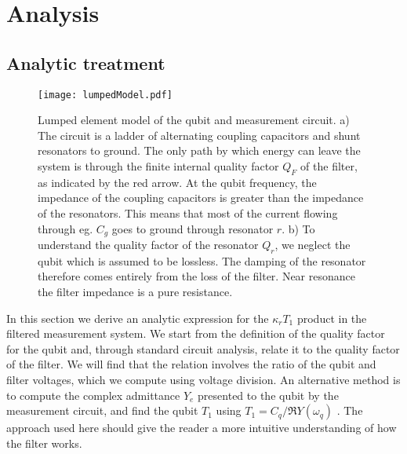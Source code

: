 \section{Analysis}

\subsection{Analytic treatment}

\begin{figure*}
\begin{centering}
\texttt{[image: lumpedModel.pdf]}
\par\end{centering}
\caption{Lumped element model of the qubit and measurement circuit. a) The circuit is a ladder of alternating coupling capacitors and shunt resonators to ground. The only path by which energy can leave the system is through the finite internal quality factor $Q_F$ of the filter, as indicated by the red arrow. At the qubit frequency, the impedance of the coupling capacitors is greater than the impedance of the resonators. This means that most of the current flowing through eg. $C_g$ goes to ground through resonator $r$. b) To understand the quality factor of the resonator $Q_r$, we neglect the qubit which is assumed to be lossless. The damping of the resonator therefore comes entirely from the loss of the filter. Near resonance the filter impedance is a pure resistance.}
\label{Fig:lumpedModel}
\end{figure*}

In this section we derive an analytic expression for the $\kappa_r T_1$ product in the filtered measurement system.
We start from the definition of the quality factor for the qubit and, through standard circuit analysis, relate it to the quality factor of the filter.
We will find that the relation involves the ratio of the qubit and filter voltages, which we compute using voltage division.
An alternative method is to compute the complex admittance $Y_e$ presented to the qubit by the measurement circuit, and find the qubit $T_1$ using $T_1 = C_q / \Re Y(\omega_q)$ \cite{Esteve:dissipation1986}.
The approach used here should give the reader a more intuitive understanding of how the filter works.

